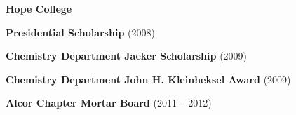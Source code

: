 \documentclass[10pt,letterpaper,courier]{article}
\newcommand{\makeheading}[1]%
        {\hspace*{-\marginparsep minus \marginparwidth}%
         \begin{minipage}[t]{\textwidth+\marginparwidth+\marginparsep}%
                {{\huge \bf \sf #1} \hfill \today}\\[-0.15\baselineskip]%
                 \rule{\columnwidth}{1pt}%
         \end{minipage}}
\newenvironment{innerlist}[1][\enskip\textbullet]%
        {\begin{compactenum}[#1]}{\end{compactenum}}
\newcommand{\blankline}{\quad\pagebreak[2]}
\begin{document}
\blankline

\textbf{Hope College}
\begin{innerlist}
\item {\bf Presidential Scholarship} (2008)
\item {\bf Chemistry Department Jaeker Scholarship} (2009)
\item {\bf Chemistry Department John H. Kleinheksel Award} (2009)
\item {\bf Alcor Chapter Mortar Board} (2011 -- 2012)
\end{innerlist}

\blankline %
\vspace{-.125in}


\blankline %
\end{document}
